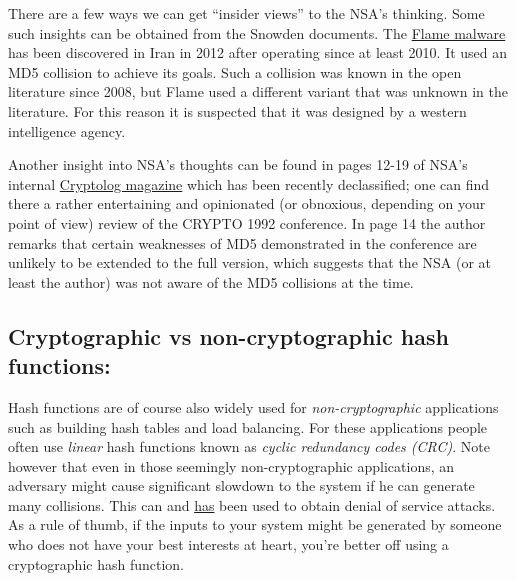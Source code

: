 There are a few ways we can get ``insider views'' to the NSA's thinking.
Some such insights can be obtained from the Snowden documents. The
\href{https://en.wikipedia.org/wiki/Flame_(malware)}{Flame malware} has
been discovered in Iran in 2012 after operating since at least 2010. It
used an MD5 collision to achieve its goals. Such a collision was known
in the open literature since 2008, but Flame used a different variant
that was unknown in the literature. For this reason it is suspected that
it was designed by a western intelligence agency.

Another insight into NSA's thoughts can be found in pages 12-19 of NSA's
internal
\href{https://www.nsa.gov/public_info/_files/cryptologs/cryptolog_126.pdf}{Cryptolog
magazine} which has been recently declassified; one can find there a
rather entertaining and opinionated (or obnoxious, depending on your
point of view) review of the CRYPTO 1992 conference. In page 14 the
author remarks that certain weaknesses of MD5 demonstrated in the
conference are unlikely to be extended to the full version, which
suggests that the NSA (or at least the author) was not aware of the MD5
collisions at the time.

\subsection{Cryptographic vs non-cryptographic hash
functions:}\label{Cryptographic-vs-non-cryp}

Hash functions are of course also widely used for
\emph{non-cryptographic} applications such as building hash tables and
load balancing. For these applications people often use \emph{linear}
hash functions known as \emph{cyclic redundancy codes (CRC)}. Note
however that even in those seemingly non-cryptographic applications, an
adversary might cause significant slowdown to the system if he can
generate many collisions. This can and
\href{http://arstechnica.com/business/2011/12/huge-portions-of-web-vulnerable-to-hashing-denial-of-service-attack/}{has}
been used to obtain denial of service attacks. As a rule of thumb, if
the inputs to your system might be generated by someone who does not
have your best interests at heart, you're better off using a
cryptographic hash function.
